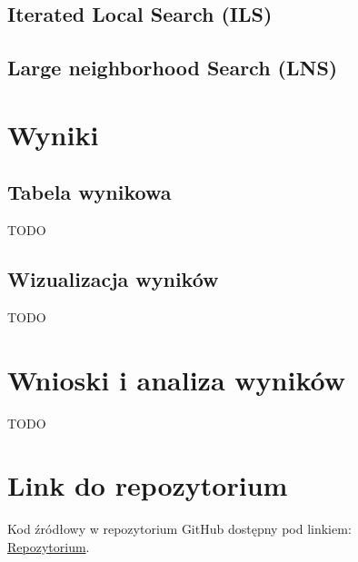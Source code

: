 \documentclass[11pt]{article}
\begin{document}
\subsection{Iterated Local Search (ILS)}\label{subsec:ils}



\subsection{Large neighborhood Search (LNS)}\label{subsec:lns}


\section{Wyniki}\label{sec:wyniki}

\subsection{Tabela wynikowa}\label{subsec:tabela-wynikowa}

TODO

\subsection{Wizualizacja wyników}\label{subsec:wizualizacja-wynikow}

TODO


\section{Wnioski i analiza wyników}\label{sec:wnioski}

TODO

\section{Link do repozytorium}\label{sec:link-do-repo}
Kod źródłowy w repozytorium GitHub dostępny pod linkiem: \\
\href{https://github.com/KotZPolibudy/PUT_IMO/tree/main/Lab3%20-%20Local_augmented}{Repozytorium}.
\end{document}
